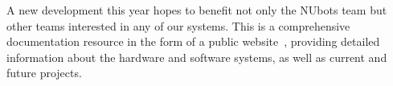 \documentclass{llncs}
\begin{document}
A new development this year hopes to benefit not only the NUbots team but other teams interested in any of our systems. This is a comprehensive documentation resource in the form of a public website~\cite{nubotsNUbookGit}, providing detailed information about the hardware and software systems, as well as current and future projects. 





\end{document}
